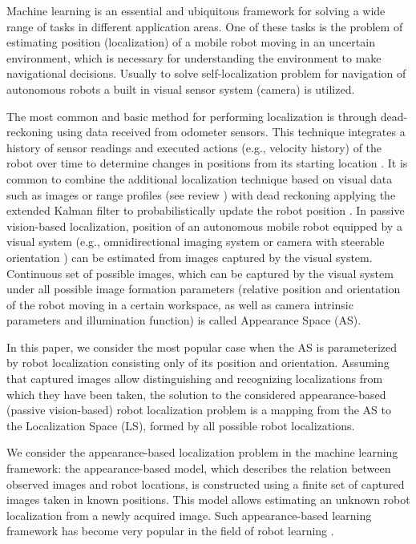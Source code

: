 \documentclass[conference]{IEEEtran} %
\begin{document}
Machine learning is an essential and ubiquitous framework for solving a wide range of tasks in different application areas. One of these tasks is the problem of estimating position (localization) of a mobile robot moving in an uncertain environment, which is necessary for understanding the environment to make navigational decisions. Usually to solve self-localization problem for navigation of autonomous robots a built in visual sensor system (camera) is utilized.

The most common and basic method for performing localization is through dead-reckoning using data received from odometer sensors. This technique integrates a history of sensor readings and executed actions (e.g., velocity history) of the robot over time to determine changes in positions from its starting location \cite{bib1,bib2,bib3}. It is common to combine the additional localization technique based on visual data such as images or range profiles (see review \cite{bib4}) with dead reckoning applying the extended Kalman filter to probabilistically update the robot position \cite{bib5,bib6}. In passive vision-based localization, position of an autonomous mobile robot equipped by a visual system (e.g., omnidirectional imaging system \cite{bib7,bib8,bib9} or camera with steerable orientation \cite{bib10}) can be estimated from images captured by the visual system. Continuous set of possible images, which can be captured by the visual system under all possible image formation parameters (relative position and orientation of the robot moving in a certain workspace, as well as camera intrinsic parameters and illumination function) is called Appearance Space (AS).

In this paper, we consider the most popular case when the AS is parameterized by robot localization  consisting only of its position and orientation. Assuming that captured images allow distinguishing and recognizing localizations from which they have been taken, the solution to the considered appearance-based (passive vision-based) robot localization problem is a mapping from the AS to the Localization Space (LS), formed by all possible robot localizations.

We consider the appearance-based localization problem in the machine learning framework: the appearance-based model, which describes the relation between observed images and robot locations, is constructed using a finite set of captured images taken in known positions. This model allows estimating an unknown robot localization from a newly acquired image. Such appearance-based learning framework has become very popular in the field of robot learning \cite{bib11}.
\end{document}
